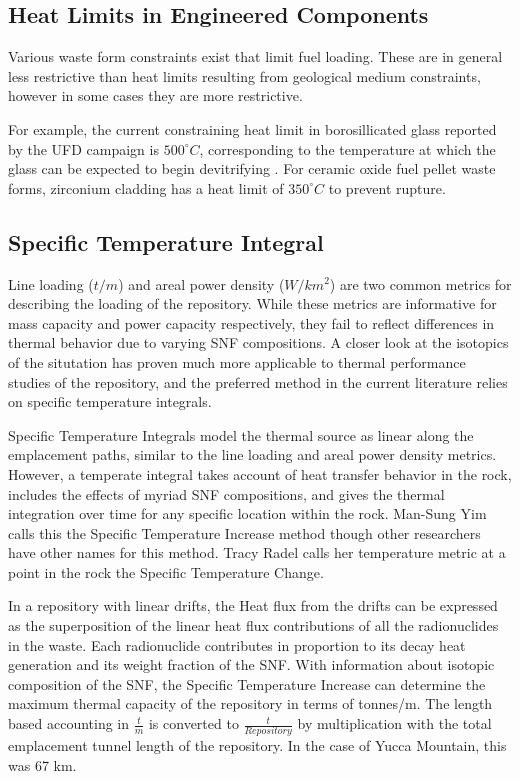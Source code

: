  


\subsection{Heat Limits in Engineered Components} 

Various waste form constraints exist that limit fuel loading. These are 
in general less restrictive than heat limits resulting from geological medium 
constraints, however in some cases they are more restrictive. 

For example, the current constraining heat limit in borosillicated glass 
reported by the \gls{UFD} campaign is $500^{\circ}C$, corresponding to the 
temperature at which the glass can be expected to begin devitrifying 
\cite{carter_2010, hardin_generic_2011, soelberg_heat_2009}. For ceramic oxide 
fuel pellet waste forms, zirconium cladding has a heat limit of $350^{\circ}C$ 
to prevent rupture. 

\subsection{Specific Temperature Integral}

Line loading ($t/m$) and areal power density ($W/km^2$) are two common metrics
for describing the loading of the repository. While these metrics are
informative for mass capacity and power capacity respectively, they fail to
reflect differences in thermal behavior due to varying SNF compositions.  A
closer look at the isotopics of the situtation has proven much more applicable
to thermal performance studies of the repository, and the preferred method in
the current literature relies on specific temperature integrals.


Specific Temperature Integrals model the thermal source as linear along the
emplacement paths, similar to the line loading and areal power density metrics.
However, a temperate integral takes account of heat transfer behavior in the
rock, includes the effects of myriad SNF compositions, and gives the thermal
integration over time for any specific location within the rock.  Man-Sung Yim
calls this the Specific Temperature Increase method\cite{li_specific_2008}
though other researchers have other names for this method. Tracy Radel calls
her temperature metric at a point in the rock the Specific Temperature
Change\cite{radel_repository_2007}.

In a repository with linear drifts, the Heat flux from the drifts can be
expressed as the superposition of the linear heat flux contributions of all the
radionuclides in the waste. Each radionuclide contributes in proportion to its
decay heat generation and its weight fraction of the SNF. With information
about isotopic composition of the SNF, the Specific Temperature Increase can
determine the maximum thermal capacity of the repository in terms of tonnes/m.
The length based accounting in $\frac{t}{m}$ is converted to
$\frac{t}{Repository}$ by multiplication with the total emplacement tunnel
length of the repository.  In the case of Yucca Mountain, this was 67 km.

